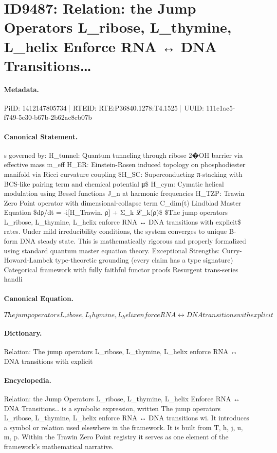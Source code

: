 \section*{ID9487: Relation: the Jump Operators L\_ribose, L\_thymine, L\_helix Enforce RNA ↔ DNA Transitions…}
\paragraph{Metadata.}
PiID: 1412147805734 | RTEID: RTE:P36840.1278:T4.1525 | UUID: 111e1ac5-f749-5c30-b67b-2b62ac8cb07b

\paragraph{Canonical Statement.}
s governed by: H\_tunnel: Quantum tunneling through ribose 2�OH barrier via effective mass m\_eff H\_ER: Einstein-Rosen induced topology on phosphodiester manifold via Ricci curvature coupling \$H\_SC: Superconducting π-stacking with BCS-like pairing term and chemical potential μ\$ H\_cym: Cymatic helical modulation using Bessel functions J\_n at harmonic frequencies H\_TZP: Trawin Zero Point operator with dimensional-collapse term C\_dim(t) Lindblad Master Equation \$dρ/dt = -i[H\_Trawin, ρ] + Σ\_k ℒ\_k(ρ)\$ \$The jump operators L\_ribose, L\_thymine, L\_helix enforce RNA ↔ DNA transitions with explicit\$ rates. Under mild irreducibility conditions, the system converges to unique B-form DNA steady state. This is mathematically rigorous and properly formalized using standard quantum master equation theory. Exceptional Strengths: Curry-Howard-Lambek type-theoretic grounding (every claim has a type signature) Categorical framework with fully faithful functor proofs Resurgent trans-series handli

\paragraph{Canonical Equation.}
\[
The jump operators L_ribose, L_thymine, L_helix enforce RNA ↔ DNA transitions with explicit
\]

\paragraph{Dictionary.}
Relation: The jump operators L\_ribose, L\_thymine, L\_helix enforce RNA ↔ DNA transitions with explicit

\paragraph{Encyclopedia.}
Relation: the Jump Operators L\_ribose, L\_thymine, L\_helix Enforce RNA ↔ DNA Transitions… is a symbolic expression, written The jump operators L\_ribose, L\_thymine, L\_helix enforce RNA ↔ DNA transitions wi. It introduces a symbol or relation used elsewhere in the framework. It is built from T, h, j, u, m, p. Within the Trawin Zero Point registry it serves as one element of the framework's mathematical narrative.
